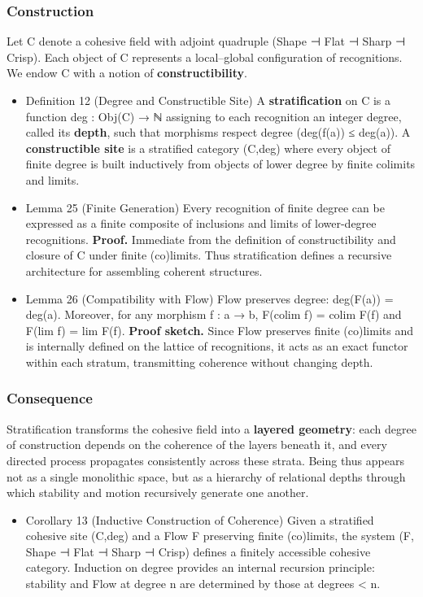 \documentclass[11pt]{article}
\begin{document}
\subsubsection*{Construction}
\label{sec:org9523f43}
Let C denote a cohesive field with adjoint quadruple (Shape ⊣ Flat ⊣ Sharp ⊣ Crisp).  
Each object of C represents a local–global configuration of recognitions.  
We endow C with a notion of \textbf{constructibility}.
\begin{itemize}
\item Definition 12 (Degree and Constructible Site)
\label{sec:orga22349d}
A \textbf{stratification} on C is a function  
deg : Obj(C) → ℕ  
assigning to each recognition an integer degree, called its \textbf{depth},  
such that morphisms respect degree (deg(f(a)) ≤ deg(a)).  
A \textbf{constructible site} is a stratified category (C,deg)  
where every object of finite degree is built inductively from objects of lower degree by finite colimits and limits.
\item Lemma 25 (Finite Generation)
\label{sec:org4b97853}
Every recognition of finite degree can be expressed as a finite composite of inclusions and limits of lower-degree recognitions.  
\textbf{Proof.}  
Immediate from the definition of constructibility and closure of C under finite (co)limits.  
Thus stratification defines a recursive architecture for assembling coherent structures.
\item Lemma 26 (Compatibility with Flow)
\label{sec:org8e344eb}
Flow preserves degree:  
deg(F(a)) = deg(a).  
Moreover, for any morphism f : a → b,  
F(colim f) = colim F(f) and F(lim f) = lim F(f).  
\textbf{Proof sketch.}  
Since Flow preserves finite (co)limits and is internally defined on the lattice of recognitions,  
it acts as an exact functor within each stratum, transmitting coherence without changing depth.
\end{itemize}
\subsubsection*{Consequence}
\label{sec:org37f11b9}
Stratification transforms the cohesive field into a \textbf{layered geometry}:  
each degree of construction depends on the coherence of the layers beneath it,  
and every directed process propagates consistently across these strata.  
Being thus appears not as a single monolithic space,  
but as a hierarchy of relational depths through which stability and motion recursively generate one another.
\begin{itemize}
\item Corollary 13 (Inductive Construction of Coherence)
\label{sec:orgb7ab761}
Given a stratified cohesive site (C,deg) and a Flow F preserving finite (co)limits,  
the system (F, Shape ⊣ Flat ⊣ Sharp ⊣ Crisp) defines a finitely accessible cohesive category.  
Induction on degree provides an internal recursion principle:  
stability and Flow at degree n are determined by those at degrees < n.
\end{itemize}
\end{document}
